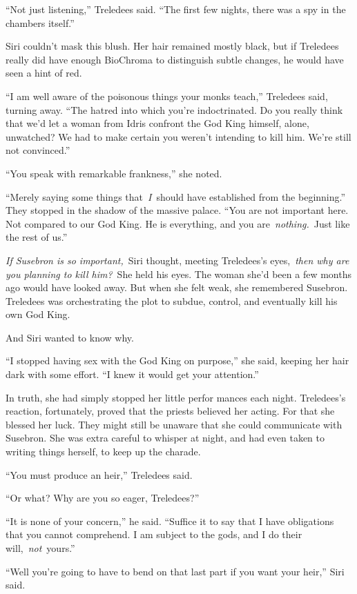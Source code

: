“Not just listening,” Treledees said. “The first few nights, there was a spy in the chambers itself.”

Siri couldn’t mask this blush. Her hair remained mostly black, but if Treledees really did have enough BioChroma to distinguish subtle changes, he would have seen a hint of red.

“I am well aware of the poisonous things your monks teach,” Treledees said, turning away. “The hatred into which you’re indoctrinated. Do you really think that we’d let a woman from Idris confront the God King himself, alone, unwatched? We had to make certain you weren’t intending to kill him. We’re still not convinced.”

“You speak with remarkable frankness,” she noted.

“Merely saying some things that~\textit{I}~should have established from the beginning.” They stopped in the shadow of the massive palace. “You are not important here. Not compared to our God King. He is everything, and you are~\textit{nothing.}~Just like the rest of us.”

\textit{If Susebron is so important,}~Siri thought, meeting Treledees’s eyes,~\textit{then why are you planning to kill him?}~She held his eyes. The woman she’d been a few months ago would have looked away. But when she felt weak, she remembered Susebron. Treledees was orchestrating the plot to subdue, control, and eventually kill his own God King.

And Siri wanted to know why.

“I stopped having sex with the God King on purpose,” she said, keeping her hair dark with some effort. “I knew it would get your attention.”

In truth, she had simply stopped her little perfor mances each night. Treledees’s reaction, fortunately, proved that the priests believed her acting. For that she blessed her luck. They might still be unaware that she could communicate with Susebron. She was extra careful to whisper at night, and had even taken to writing things herself, to keep up the charade.

“You must produce an heir,” Treledees said.

“Or what? Why are you so eager, Treledees?”

“It is none of your concern,” he said. “Suffice it to say that I have obligations that you cannot comprehend. I am subject to the gods, and I do their will,~\textit{not}~yours.”

“Well you’re going to have to bend on that last part if you want your heir,” Siri said.

